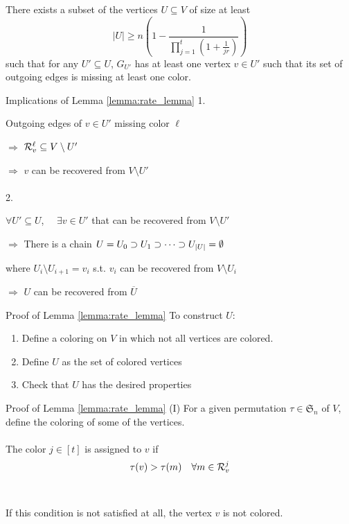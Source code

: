 \begin{frame}
    \begin{lema}
        \label{lemma:rate_lemma}
        There exists a subset of the vertices $U \subseteq V$ of size at least
        $$ \vert U \vert \geq n \left( 1 - \frac{1}{\prod_{j=1}^{t} \left(1 + \frac{1}{jr} \right)} \right) $$
        such that for any $U' \subseteq U$, $G_{U'}$ has at least one vertex $v \in U'$ such that its set of outgoing edges is missing at least one color.
    
    \end{lema}
\end{frame}

\begin{frame}{Implications of Lemma \ref{lemma:rate_lemma}}
    1.
    
    Outgoing edges of $v \in U'$ missing color $\ell$
    
    $\Rightarrow$ $\mathcal{R}_v^\ell \subseteq V \setminus U'$
    
    $\Rightarrow$ $v$ can be recovered from $V \setminus U'$ \\~\\
    
    2.
    
    $\forall U' \subseteq U$,  $\quad \exists v \in U'$ that can be recovered from $V \setminus U'$
    
    $\Rightarrow$ There is a chain $U = U_0 \supset U_1 \supset \dots \supset U_{\left\vert {U} \right\vert} = \emptyset $
    
    where $U_i \setminus U_{i+1} = v_i $ s.t. $v_i$ can be recovered from $V \setminus U_i$
    
    $\Rightarrow$ $U$ can be recovered from $\overline{U}$
    
\end{frame}

\begin{frame}{Proof of Lemma \ref{lemma:rate_lemma}}
    To construct $U$:
    \begin{enumerate}[<+->]
        \item Define a coloring on $V$ in which not all vertices are colored.
        \item Define $U$ as the set of colored vertices
        \item Check that $U$ has the desired properties
    \end{enumerate}
\end{frame}

\begin{frame}{Proof of Lemma \ref{lemma:rate_lemma} (I)}
    For a given permutation $\tau \in \mathfrak{S}_n$ of $V$, define the coloring of some of the vertices. \\~\\
    
    The color $j \in [t]$ is assigned to $v$ if
    $$\tau(v) > \tau(m) \quad \forall m \in \mathcal{R}_v^j$$ \\~\\
    
    If this condition is not satisfied at all, the vertex $v$ is not colored.
\end{frame}

